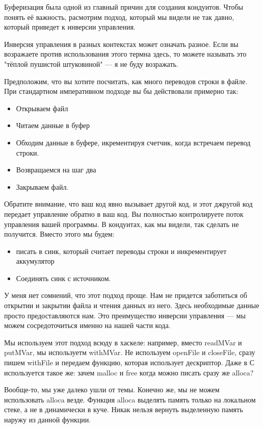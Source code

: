 \begin{verbaim}
Буферизация была одной из главный причин для создания кондуитов. Чтобы понять её важность, расмотрим подход, который мы видели не так давно, который приведет к инверсии управления.

Инверсия управления в разных контекстах может означать разное. Если вы возражаете против использования этого термна здесь, то можете называть это "тёплой пушистой штуковиной" --- я не буду возражать.

Предположим, что вы хотите посчитать, как много переводов строки в файле. При стандартном императивном подходе вы бы действовали примерно так:

\begin{itemize}  
\item   Открываем файл
\item   Читаем данные в буфер
\item   Обходим данные в буфере, икрементируя счетчик, когда встречаем перевод строки.
\item   Возвращаемся на шаг два
\item   Закрываем файл.
\end{itemize}
Обратите внимание, что ваш код явно вызывает другой код, и этот джругой код передает управление обратно в ваш код. Вы полностью контролируете поток управления вашей программы. В кондуитах, как мы видели, так сделать не получится. Вместо этого мы будем:
\begin{itemize}
\item  писать в синк, который считает переводы строки и инкрементирует аккумулятор
\item  Соединять синк с источником.
\end{itemize} 
У меня нет сомнений, что этот подход проще. Нам не придется заботиться об открытии и закрытии файла и чтения данных из него. Здесь необходимые данные просто предоставляются нам. Это преимущество инверсии управления --- мы можем сосредоточиться именно на нашей части кода.

Мы используем этот подход всюду в хаскеле: например, вместо readMVar и putMVar, мы используетм withMVar. Не используем openFile и closeFile, сразу пишем withFile и передаем функцию, которая использует дескриптор. Даже в С используется такое же: зачем malloc и free когда можно писать сразу же alloca?

Вообще-то, мы уже далеко ушли от темы. Конечно же, мы не можем использовать alloca везде. Функция alloca выделять память только на локальном стеке, а не в динамически в куче. Никак нельзя вернуть выделенную память наружу из данной функции.


\end{verbaim}
